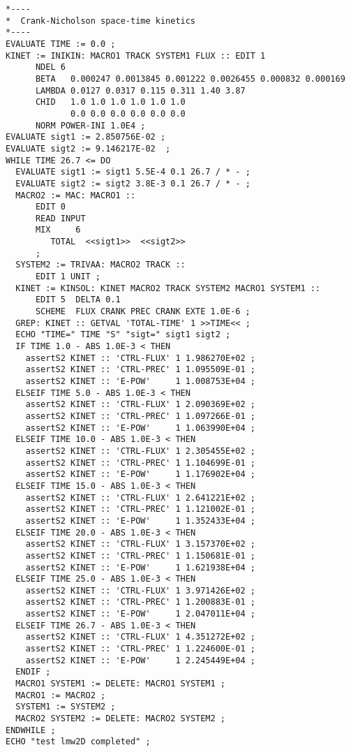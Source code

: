 \begin{verbatim}
*----
*  Crank-Nicholson space-time kinetics
*----
EVALUATE TIME := 0.0 ;
KINET := INIKIN: MACRO1 TRACK SYSTEM1 FLUX :: EDIT 1
      NDEL 6
      BETA   0.000247 0.0013845 0.001222 0.0026455 0.000832 0.000169
      LAMBDA 0.0127 0.0317 0.115 0.311 1.40 3.87    
      CHID   1.0 1.0 1.0 1.0 1.0 1.0
             0.0 0.0 0.0 0.0 0.0 0.0
      NORM POWER-INI 1.0E4 ;
EVALUATE sigt1 := 2.850756E-02 ;
EVALUATE sigt2 := 9.146217E-02  ;
WHILE TIME 26.7 <= DO
  EVALUATE sigt1 := sigt1 5.5E-4 0.1 26.7 / * - ;
  EVALUATE sigt2 := sigt2 3.8E-3 0.1 26.7 / * - ;
  MACRO2 := MAC: MACRO1 ::
      EDIT 0
      READ INPUT
      MIX     6
         TOTAL  <<sigt1>>  <<sigt2>>
      ;
  SYSTEM2 := TRIVAA: MACRO2 TRACK ::
      EDIT 1 UNIT ;
  KINET := KINSOL: KINET MACRO2 TRACK SYSTEM2 MACRO1 SYSTEM1 ::
      EDIT 5  DELTA 0.1 
      SCHEME  FLUX CRANK PREC CRANK EXTE 1.0E-6 ;
  GREP: KINET :: GETVAL 'TOTAL-TIME' 1 >>TIME<< ;
  ECHO "TIME=" TIME "S" "sigt=" sigt1 sigt2 ;
  IF TIME 1.0 - ABS 1.0E-3 < THEN
    assertS2 KINET :: 'CTRL-FLUX' 1 1.986270E+02 ;
    assertS2 KINET :: 'CTRL-PREC' 1 1.095509E-01 ;
    assertS2 KINET :: 'E-POW'     1 1.008753E+04 ;
  ELSEIF TIME 5.0 - ABS 1.0E-3 < THEN
    assertS2 KINET :: 'CTRL-FLUX' 1 2.090369E+02 ;
    assertS2 KINET :: 'CTRL-PREC' 1 1.097266E-01 ;
    assertS2 KINET :: 'E-POW'     1 1.063990E+04 ;
  ELSEIF TIME 10.0 - ABS 1.0E-3 < THEN
    assertS2 KINET :: 'CTRL-FLUX' 1 2.305455E+02 ;
    assertS2 KINET :: 'CTRL-PREC' 1 1.104699E-01 ;
    assertS2 KINET :: 'E-POW'     1 1.176902E+04 ;
  ELSEIF TIME 15.0 - ABS 1.0E-3 < THEN
    assertS2 KINET :: 'CTRL-FLUX' 1 2.641221E+02 ;
    assertS2 KINET :: 'CTRL-PREC' 1 1.121002E-01 ;
    assertS2 KINET :: 'E-POW'     1 1.352433E+04 ;
  ELSEIF TIME 20.0 - ABS 1.0E-3 < THEN
    assertS2 KINET :: 'CTRL-FLUX' 1 3.157370E+02 ;
    assertS2 KINET :: 'CTRL-PREC' 1 1.150681E-01 ;
    assertS2 KINET :: 'E-POW'     1 1.621938E+04 ;
  ELSEIF TIME 25.0 - ABS 1.0E-3 < THEN
    assertS2 KINET :: 'CTRL-FLUX' 1 3.971426E+02 ;
    assertS2 KINET :: 'CTRL-PREC' 1 1.200883E-01 ;
    assertS2 KINET :: 'E-POW'     1 2.047011E+04 ;
  ELSEIF TIME 26.7 - ABS 1.0E-3 < THEN
    assertS2 KINET :: 'CTRL-FLUX' 1 4.351272E+02 ;
    assertS2 KINET :: 'CTRL-PREC' 1 1.224600E-01 ;
    assertS2 KINET :: 'E-POW'     1 2.245449E+04 ;
  ENDIF ;
  MACRO1 SYSTEM1 := DELETE: MACRO1 SYSTEM1 ;
  MACRO1 := MACRO2 ;
  SYSTEM1 := SYSTEM2 ;
  MACRO2 SYSTEM2 := DELETE: MACRO2 SYSTEM2 ;
ENDWHILE ;
ECHO "test lmw2D completed" ;
\end{verbatim}
